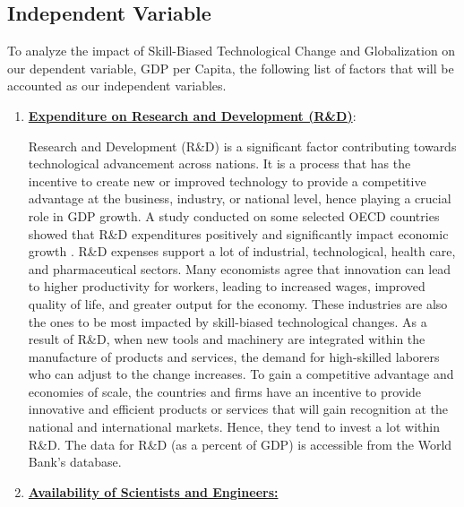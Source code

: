 \subsection{Independent Variable}

To analyze the impact of Skill-Biased Technological Change and Globalization on our dependent variable, GDP per Capita, the following list of factors that will be accounted as our independent variables.

\begin{enumerate}
\item \underline{\textbf{Expenditure on Research and Development (R\&D)}}: 

Research and Development (R\&D) is a significant factor contributing towards technological advancement across nations. It is a process that has the incentive to create new or improved technology to provide a competitive advantage at the business, industry, or national level, hence playing a crucial role in GDP growth. A study conducted on some selected OECD countries showed that R\&D expenditures positively and significantly impact economic growth \cite{surani2017economic}. R\&D expenses support a lot of industrial, technological, health care, and pharmaceutical sectors. Many economists agree that innovation can lead to higher productivity for workers, leading to increased wages, improved quality of life, and greater output for the economy. These industries are also the ones to be most impacted by skill-biased technological changes. As a result of R\&D, when new tools and machinery are integrated within the manufacture of products and services, the demand for high-skilled laborers who can adjust to the change increases. To gain a competitive advantage and economies of scale, the countries and firms have an incentive to provide innovative and efficient products or services that will gain recognition at the national and international markets. Hence, they tend to invest a lot within R\&D. The data for R\&D (as a percent of GDP) is accessible from the World Bank's database.

\item \underline{\textbf{Availability of Scientists and Engineers:}}


\end{enumerate}
